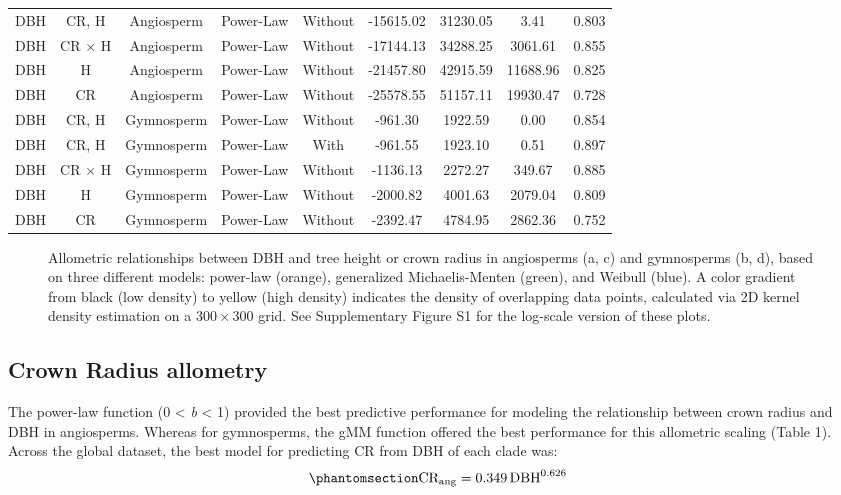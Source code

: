 \documentclass[
  12pt,
  letterpaper,
  DIV=11,
  numbers=noendperiod]{scrartcl}
\makeatletter
\newcommand*\pandocbounded[1]{%
  \sbox\pandoc@box{#1}%
  \Gscale@div\@tempa{\textheight}{\dimexpr\ht\pandoc@box+\dp\pandoc@box\relax}%
  \Gscale@div\@tempb{\linewidth}{\wd\pandoc@box}%
  \ifdim\@tempb\p@<\@tempa\p@\let\@tempa\@tempb\fi%
  \ifdim\@tempa\p@<\p@\scalebox{\@tempa}{\usebox\pandoc@box}%
  \else\usebox{\pandoc@box}%
  \fi%
}
\makeatother
\begin{document}
\begin{longtable*}[t]{ccccccccc}
DBH & CR, H & Angiosperm & Power-Law & Without & -15615.02 & 31230.05 & 3.41 & 0.803\\
DBH & CR × H & Angiosperm & Power-Law & Without & -17144.13 & 34288.25 & 3061.61 & 0.855\\
DBH & H & Angiosperm & Power-Law & Without & -21457.80 & 42915.59 & 11688.96 & 0.825\\
\addlinespace
DBH & CR & Angiosperm & Power-Law & Without & -25578.55 & 51157.11 & 19930.47 & 0.728\\
DBH & CR, H & Gymnosperm & Power-Law & Without & -961.30 & 1922.59 & 0.00 & 0.854\\
DBH & CR, H & Gymnosperm & Power-Law & With & -961.55 & 1923.10 & 0.51 & 0.897\\
DBH & CR × H & Gymnosperm & Power-Law & Without & -1136.13 & 2272.27 & 349.67 & 0.885\\
DBH & H & Gymnosperm & Power-Law & Without & -2000.82 & 4001.63 & 2079.04 & 0.809\\
\addlinespace
DBH & CR & Gymnosperm & Power-Law & Without & -2392.47 & 4784.95 & 2862.36 & 0.752\\
\bottomrule
\end{longtable*}
\endgroup{}

\newpage

\begin{figure}

\centering{

\pandocbounded{\texttt{[image: ../figs/h\_cr\_dbh\_non\_log.png]}}

}

\caption{\label{fig-compare}Allometric relationships between DBH and
tree height or crown radius in angiosperms (a, c) and gymnosperms (b,
d), based on three different models: power-law (orange), generalized
Michaelis-Menten (green), and Weibull (blue). A color gradient from
black (low density) to yellow (high density) indicates the density of
overlapping data points, calculated via 2D kernel density estimation on
a 300\,\(\times\)\,300 grid. See Supplementary Figure S1 for the
log-scale version of these plots.}

\end{figure}%

\subsection{Crown Radius allometry}\label{crown-radius-allometry}

The power-law function (0 \textless{} \emph{b} \textless{} 1) provided
the best predictive performance for modeling the relationship between
crown radius and DBH in angiosperms. Whereas for gymnosperms, the gMM
function offered the best performance for this allometric scaling (Table
1). Across the global dataset, the best model for predicting CR from DBH
of each clade was: \begin{equation}\phantomsection\label{eq-cr_ang}{
\mathrm{CR_{ang}} = \mathrm{0.349}
\, \mathrm{DBH}^{\mathrm{0.626}}
}\end{equation}
\end{document}
